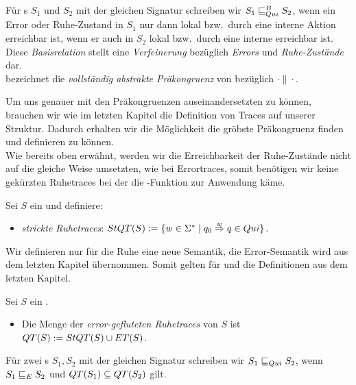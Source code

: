 \begin{Def}
  Für \EIO{}s $S_1$ und $S_2$ mit der gleichen Signatur schreiben wir
  $S_1\sqsubseteq _{Qui}^B S_2$, wenn ein Error oder Ruhe-Zustand in $S_1$ nur dann lokal
  bzw.\ durch eine interne Aktion erreichbar ist, wenn er auch in $S_2$ lokal
  bzw.\ durch eine interne erreichbar ist. Diese \emph{Basisrelation} stellt
  eine \emph{Verfeinerung} bezüglich \emph{Errors} und \emph{Ruhe-Zustände}
  dar.\\
  \QCRel{} bezeichnet die \emph{vollständig abstrakte Präkongruenz} von
  \QBRel{} bezüglich $\cdot\|\cdot$.
\end{Def}

Um uns genauer mit den Präkongruenzen auseinandersetzten zu können, brauchen
wir wie im letzten Kapitel die Definition von Traces auf unserer Struktur.
Dadurch erhalten wir die Möglichkeit die gröbste Präkongruenz finden und
definieren zu können.\\
Wie bereits oben erwähnt, werden wir die Erreichbarkeit der Ruhe-Zustände nicht
auf die gleiche Weise umsetzten, wie bei Errortraces, somit benötigen wir keine
gekürzten Ruhetraces bei der die \prune{}-Funktion zur Anwendung käme.

\begin{Def}[Ruhetraces]
  \label{DefRuhetraces}
  Sei $S$ ein \EIO{} und definiere:
  \begin{itemize}
    \item \emph{strickte Ruhetraces}: $StQT{}(S) := \{w\in\Sigma ^*\mid q_0
      \overset{w}{\Rightarrow} q\in Qui\}$.
  \end{itemize}
\end{Def}

Wir definieren nur für die Ruhe eine neue Semantik, die Error-Semantik wird aus
dem letzten Kapitel übernommen. Somit gelten für \ET{} und \EL{} die
Definitionen aus dem letzten Kapitel.

\begin{Def}
  \label{DefQTQL}
  Sei $S$ ein \EIO{}.
  \begin{itemize}
    \item Die Menge der \emph{error-gefluteten Ruhetraces} von $S$ ist
      $QT{}(S) := StQT{}(S)\cup ET{}(S)$.
  \end{itemize}
  Für zwei \EIO{}s $S_1, S_2$ mit der gleichen Signatur schreiben wir
  $S_1\sqsubseteq _{Qui} S_2$, wenn $S_1\sqsubseteq _E S_2$ und $QT{}(S_1)\subseteq QT{}(S_2)$ gilt.
\end{Def}

